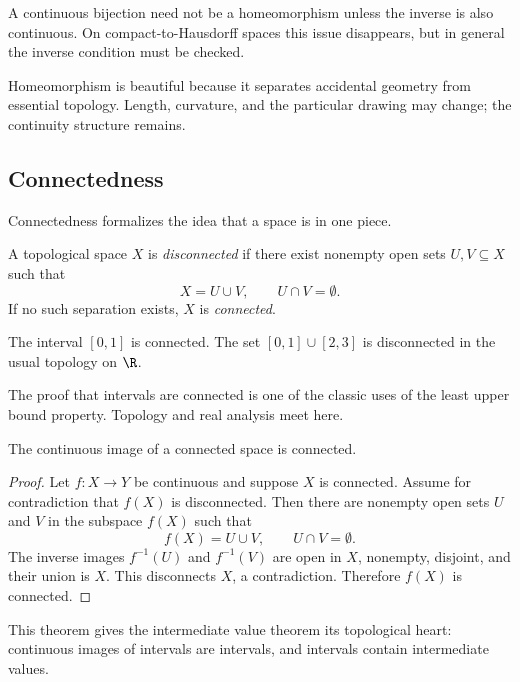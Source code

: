 \begin{trapbox}
A continuous bijection need not be a homeomorphism unless the inverse is also
continuous. On compact-to-Hausdorff spaces this issue disappears, but in general
the inverse condition must be checked.
\end{trapbox}

\begin{aestheticbox}
Homeomorphism is beautiful because it separates accidental geometry from
essential topology. Length, curvature, and the particular drawing may change;
the continuity structure remains.
\end{aestheticbox}

\subsection{Connectedness}

Connectedness formalizes the idea that a space is in one piece.

\begin{definition}
A topological space $X$ is \emph{disconnected} if there exist nonempty open
sets $U,V\subseteq X$ such that
\[
X=U\cup V,\qquad U\cap V=\emptyset.
\]
If no such separation exists, $X$ is \emph{connected}.
\end{definition}

\begin{example}
The interval $[0,1]$ is connected. The set $[0,1]\cup[2,3]$ is disconnected in
the usual topology on $\R$.
\end{example}

The proof that intervals are connected is one of the classic uses of the least
upper bound property. Topology and real analysis meet here.

\begin{theorem}
The continuous image of a connected space is connected.
\end{theorem}

\begin{proof}
Let $f:X\to Y$ be continuous and suppose $X$ is connected. Assume for
contradiction that $f(X)$ is disconnected. Then there are nonempty open sets
$U$ and $V$ in the subspace $f(X)$ such that
\[
f(X)=U\cup V,\qquad U\cap V=\emptyset.
\]
The inverse images $f^{-1}(U)$ and $f^{-1}(V)$ are open in $X$, nonempty,
disjoint, and their union is $X$. This disconnects $X$, a contradiction.
Therefore $f(X)$ is connected.
\end{proof}

This theorem gives the intermediate value theorem its topological heart:
continuous images of intervals are intervals, and intervals contain intermediate
values.

